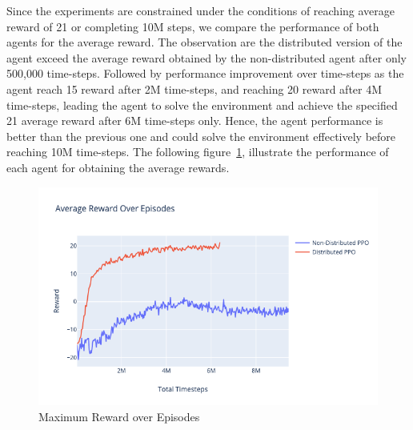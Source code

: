 Since the experiments are constrained under the conditions of reaching average reward of 21 or completing 10M steps, we compare the performance of both agents for the average reward. The observation are the distributed version of the agent exceed the average reward obtained by the non-distributed agent after only 500,000 time-steps. Followed by performance improvement over time-steps as the agent reach 15 reward after 2M time-steps, and reaching 20 reward after 4M time-steps, leading the agent to solve the environment and achieve the specified 21 average reward after 6M time-steps only. Hence, the agent performance is better than the previous one and could solve the environment effectively before reaching 10M time-steps. The following figure~\ref{fig:2nd_exp_avg_eps_reward}, illustrate the performance of each agent for obtaining the average rewards.
\begin{figure}[!htb]
		\centering
		\includegraphics[width=\linewidth]{figures/exps/2nd_exp/avg_eps_reward.png}
		\caption{Maximum Reward over Episodes}
		\label{fig:2nd_exp_avg_eps_reward}
\end{figure}

